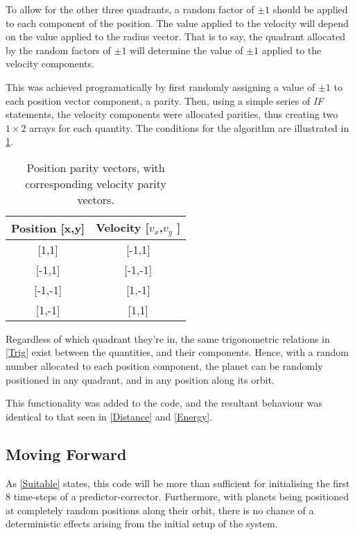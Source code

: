 \documentclass[a4paper,10pt]{article}
\begin{document}
To allow for the other three quadrants, a random factor of $\pm 1$ should be applied to each component of the position. The value applied to the velocity will depend on the value applied to the radius vector. That is to say, the quadrant allocated by the random factors of $\pm1$ will determine the value of $\pm1$ applied to the velocity components. 

This was achieved programatically by first randomly assigning a value of $\pm 1$ to each position vector component, a parity. Then, using a simple series of \textit{IF} statements, the velocity components were allocated parities, thus creating two $1\times 2$ arrays for each quantity. The conditions for the algorithm are illustrated in \cref{Algorithm}.

\begin{table}[h!]
\centering
\def\arraystretch{1.7}
\begin{tabular}{c|c}
\multicolumn{1}{l|}{Position {[}x,y{]}} & \multicolumn{1}{l}{Velocity {[}$v_x$,$v_y$ {]}} \\ \hline
{[}1,1{]}                               & {[}-1,1{]}                                      \\ \hline
{[}-1,1{]}                              & {[}-1,-1{]}                                     \\ \hline
{[}-1,-1{]}                             & {[}1,-1{]}                                      \\ \hline
{[}1,-1{]}                              & {[}1,1{]}                                      
\end{tabular}
\caption{\label{Algorithm} Position parity vectors, with corresponding velocity parity vectors.}
\end{table}

Regardless of which quadrant they're in, the same trigonometric relations in \cref{Trig} exist between the quantities, and their components. Hence, with a random number allocated to each position component, the planet can be randomly positioned in any quadrant, and in any position along its orbit.

This functionality was added to the code, and the resultant behaviour was identical to that seen in \cref{Distance} and \cref{Energy}.

\subsection{Moving Forward}

As \cref{Suitable} states, this code will be more than sufficient for initialising the first 8 time-steps of a predictor-corrector. Furthermore, with planets being positioned at completely random positions along their orbit, there is no chance of a deterministic effects arising from the initial setup of the system. 
\end{document}
